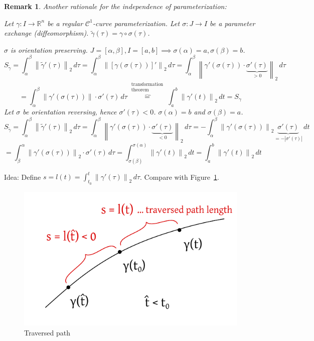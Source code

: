 \documentclass{article}
\newtheorem{remark}{Remark}  \numberwithin{remark}{section}
\newcommand{\norm}[1]{\left\|#1\right\|}
\newcommand{\card}[1]{\left|#1\right|}
\begin{document}
\begin{remark}
  Another rationale for the independence of parameterization:

  Let $\gamma: I \to \mathbb R^n$ be a regular $\mathcal C^1$-curve parameterization.
  Let $\sigma: J \to I$ be a parameter exchange (diffeomorphism).
  $\tilde\gamma(\tau) = \gamma \circ \sigma(\tau)$.

  $\sigma$ is orientation preserving. $J = [\alpha, \beta], I = [a,b] \implies \sigma(\alpha) = a, \sigma(\beta) = b$.
  \[ S_{\tilde\gamma} = \int_\alpha^\beta \norm{\tilde\gamma'(\tau)}_2 \, d\tau = \int_\alpha^\beta \norm{[\gamma(\sigma(\tau))]'}_2 \, d\tau = \int_\alpha^\beta \norm{\gamma'(\sigma(\tau)) \cdot \underbrace{\sigma'(\tau)}_{> 0}}_2 \, d\tau \]
  \[ = \int_\alpha^\beta \norm{\gamma'(\sigma(\tau))} \cdot \sigma'(\tau) \, d\tau \overbrace{=}^{\substack{\text{transformation} \\ \text{theorem}}} \int_a^b \norm{\gamma'(t)}_2 \, dt = S_\gamma \]
  Let $\sigma$ be orientation reversing, hence $\sigma'(\tau) < 0$. $\sigma(\alpha) = b$ and $\sigma(\beta) = a$.
  \[ S_{\tilde\gamma} = \int_{\alpha}^\beta \norm{\tilde\gamma'(\tau)}_2 \, d\tau = \int_{\alpha}^{\beta} \norm{\gamma'(\sigma(\tau)) \cdot \underbrace{\sigma'(\tau)}_{< 0}}_2 \, d\tau = -\int_{\alpha}^{\beta} \norm{\gamma'(\sigma(\tau))}_2 \underbrace{\sigma'(\tau)}_{= -\card{\sigma'(\tau)}} \, dt \]
  \[ = \int_\beta^\alpha \norm{\gamma'(\sigma(\tau))}_2 \cdot \sigma'(\tau) \, d\tau = \int_{\sigma(\beta)}^{\sigma(\alpha)} \norm{\gamma'(t)}_2 \, dt = \int_a^b \norm{\gamma'(t)}_2 \, dt \]
\end{remark}

Idea: Define $s = l(t) = \int_{t_0}^t \norm{\gamma'(\tau)}_2 \, d\tau$. Compare with Figure~\ref{img:traversedpath}.

\begin{figure}[t]
  \begin{center}
    \includegraphics{img/47_traversed_path.pdf}
    \caption{Traversed path}
    \label{img:traversedpath}
  \end{center}
\end{figure}
\end{document}
